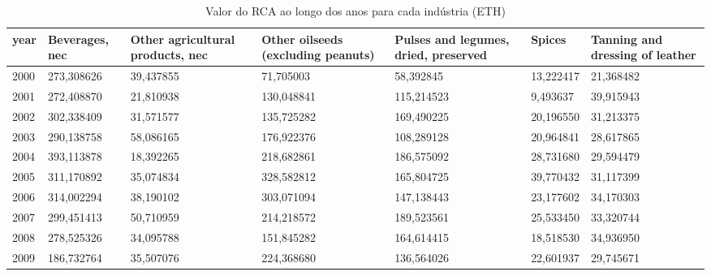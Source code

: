 \begin{table}
\centering
\caption{Valor do RCA ao longo dos anos para cada indústria (ETH)}
\begin{tabular}{p{1cm}p{2cm}p{2cm}p{2cm}p{2cm}p{2cm}p{2cm}}
\toprule
 year &  Beverages, nec &  Other agricultural products, nec &  Other oilseeds (excluding peanuts) &  Pulses and legumes, dried, preserved &    Spices &  Tanning and dressing of leather \\
\midrule
 2000 &      273,308626 &                         39,437855 &                           71,705003 &                             58,392845 & 13,222417 &                        21,368482 \\
 2001 &      272,408870 &                         21,810938 &                          130,048841 &                            115,214523 &  9,493637 &                        39,915943 \\
 2002 &      302,338409 &                         31,571577 &                          135,725282 &                            169,490225 & 20,196550 &                        31,213375 \\
 2003 &      290,138758 &                         58,086165 &                          176,922376 &                            108,289128 & 20,964841 &                        28,617865 \\
 2004 &      393,113878 &                         18,392265 &                          218,682861 &                            186,575092 & 28,731680 &                        29,594479 \\
 2005 &      311,170892 &                         35,074834 &                          328,582812 &                            165,804725 & 39,770432 &                        31,117399 \\
 2006 &      314,002294 &                         38,190102 &                          303,071094 &                            147,138443 & 23,177602 &                        34,170303 \\
 2007 &      299,451413 &                         50,710959 &                          214,218572 &                            189,523561 & 25,533450 &                        33,320744 \\
 2008 &      278,525326 &                         34,095788 &                          151,845282 &                            164,614415 & 18,518530 &                        34,936950 \\
 2009 &      186,732764 &                         35,507076 &                          224,368680 &                            136,564026 & 22,601937 &                        29,745671 \\

\end{tabular}
\end{table}

